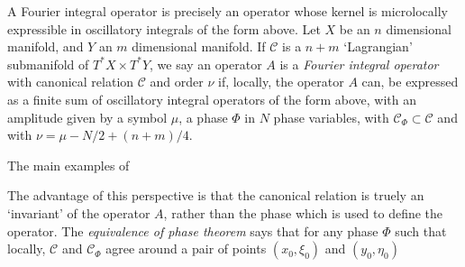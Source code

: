 %
%
%
%

A Fourier integral operator is precisely an operator whose kernel is microlocally expressible in oscillatory integrals of the form above. Let $X$ be an $n$ dimensional manifold, and $Y$ an $m$ dimensional manifold. If $\mathcal{C}$ is a $n + m$ `Lagrangian' submanifold of $T^* X \times T^* Y$, we say an operator $A$ is a \emph{Fourier integral operator} with canonical relation $\mathcal{C}$ and order $\nu$ if, locally, the operator $A$ can, be expressed as a finite sum of oscillatory integral operators of the form above, with an amplitude given by a symbol $\mu$, a phase $\Phi$ in $N$ phase variables, with $\mathcal{C}_\Phi \subset \mathcal{C}$ and with $\nu = \mu - N/2 + (n+m)/4$.

The main examples of 

The advantage of this perspective is that the canonical relation is truely an `invariant' of the operator $A$, rather than the phase which is used to define the operator. The \emph{equivalence of phase theorem} says that for any phase $\Phi$ such that locally, $\mathcal{C}$ and $\mathcal{C}_\Phi$ agree around a pair of points $(x_0,\xi_0)$ and $(y_0,\eta_0)$


